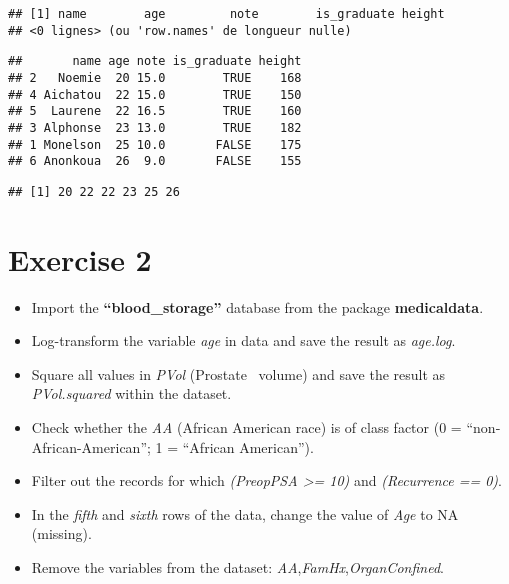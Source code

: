 \documentclass[
]{book}
\newenvironment{Shaded}{\begin{snugshade}}{\end{snugshade}}
\newcommand{\CommentTok}[1]{\textcolor[rgb]{0.56,0.35,0.01}{\textit{#1}}}
\newcommand{\FunctionTok}[1]{\textcolor[rgb]{0.13,0.29,0.53}{\textbf{#1}}}
\newcommand{\NormalTok}[1]{#1}
\newcommand{\OtherTok}[1]{\textcolor[rgb]{0.56,0.35,0.01}{#1}}
\newcommand{\SpecialCharTok}[1]{\textcolor[rgb]{0.81,0.36,0.00}{\textbf{#1}}}
\begin{document}
\begin{verbatim}
## [1] name        age         note        is_graduate height     
## <0 lignes> (ou 'row.names' de longueur nulle)
\end{verbatim}

\begin{Shaded}
\end{Shaded}

\begin{verbatim}
##       name age note is_graduate height
## 2   Noemie  20 15.0        TRUE    168
## 4 Aichatou  22 15.0        TRUE    150
## 5  Laurene  22 16.5        TRUE    160
## 3 Alphonse  23 13.0        TRUE    182
## 1 Monelson  25 10.0       FALSE    175
## 6 Anonkoua  26  9.0       FALSE    155
\end{verbatim}

\begin{Shaded}
\end{Shaded}

\begin{verbatim}
## [1] 20 22 22 23 25 26
\end{verbatim}

\section{Exercise 2}\label{exercise-2}

\begin{itemize}
\item
  Import the \textbf{``blood\_storage''} database from the package \textbf{medicaldata}.
\item
  Log-transform the variable \emph{age} in data and save the result as \emph{age.log}.
\item
  Square all values in \emph{PVol} (Prostate
  ~volume) and save the result as \emph{PVol.squared} within the dataset.
\item
  Check whether the \emph{AA} (African American race) is of class factor (0 = ``non‐African-American''; 1 = ``African American'').
\item
  Filter out the records for which \emph{(PreopPSA \textgreater= 10)} and \emph{(Recurrence == 0)}.
\item
  In the \emph{fifth} and \emph{sixth} rows of the data, change the value of \emph{Age} to NA (missing).
\item
  Remove the variables from the dataset: \emph{AA},\emph{FamHx},\emph{OrganConfined}.
\end{itemize}
\end{document}
